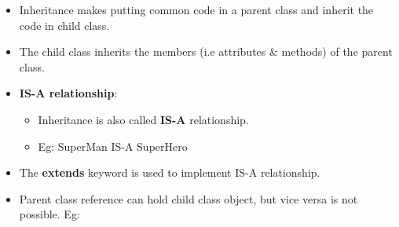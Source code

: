 \setlength{\columnsep}{3pt}
\begin{flushleft}

\begin{itemize}
	\item Inheritance makes  putting common code in a parent class and inherit the code in child class.
	\item The child class inherits the members (i.e attributes \& methods) of the parent class.

	\newpage	
	\item \textbf{IS-A relationship}: 
	\begin{itemize}
		\item Inheritance is also called \textbf{IS-A} relationship.
		\item Eg: SuperMan IS-A SuperHero
	\end{itemize}
	\bigskip
	\item The \textbf{extends} keyword is used to implement IS-A relationship.
	\bigskip

	\item Parent class reference can hold child class object, but vice versa is not possible. Eg:
	
\end{itemize}
\end{flushleft}
